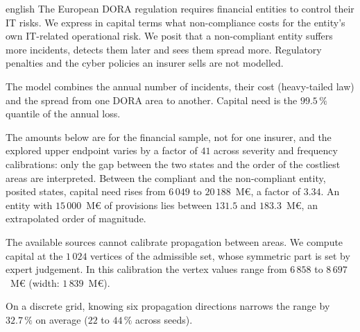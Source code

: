 \begin{otherlanguage*}{english}
The European DORA regulation requires financial entities to control their IT risks. We express in capital terms what non-compliance costs for the entity's own IT-related
operational risk. We posit that a non-compliant entity suffers more incidents, detects them later and sees them spread more.
Regulatory penalties and the cyber policies an insurer sells are not modelled. 

The model combines the annual number of incidents, their cost (heavy-tailed law) and the spread from one DORA area to another. Capital need is the $99.5\,\%$ quantile of the annual loss.

The amounts below are for the financial sample, not for one insurer, and
the explored upper endpoint varies by a factor of $41$ across severity and frequency calibrations: only the gap
between the two states and the order of the costliest areas are interpreted. Between the compliant
and the non-compliant entity, posited states, capital need rises from $6\,049$ to
$20\,188$~M\euro, a factor of $3.34$. An entity with $15\,000$~M\euro{} of provisions lies between
$131.5$ and $183.3$~M\euro, an extrapolated order of magnitude.

The available sources cannot calibrate propagation between areas. We compute
capital at the $1\,024$ vertices of the admissible set, whose symmetric part is set by expert judgement. In this calibration the vertex values range from $6\,858$ to $8\,697$~M\euro{} (width:
$1\,839$~M\euro{}).

On a discrete grid, knowing six propagation directions narrows the range by $32.7\,\%$ on average ($22$ to $44\,\%$ across seeds).
\end{otherlanguage*}

\setcounter{tocdepth}{1}
\tableofcontents


